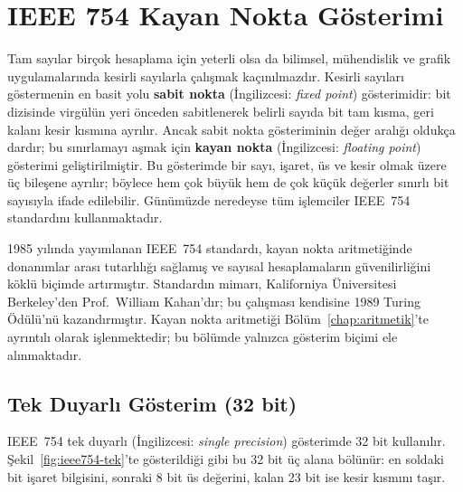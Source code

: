 \section{IEEE 754 Kayan Nokta Gösterimi}
\label{sec:ekA-ieee754}

Tam sayılar birçok hesaplama için yeterli olsa da bilimsel, mühendislik ve grafik uygulamalarında kesirli sayılarla çalışmak kaçınılmazdır. Kesirli sayıları göstermenin en basit yolu \textbf{sabit nokta} (İngilizcesi: \textit{fixed point}) gösterimidir: bit dizisinde virgülün yeri önceden sabitlenerek belirli sayıda bit tam kısma, geri kalanı kesir kısmına ayrılır. Ancak sabit nokta gösteriminin değer aralığı oldukça dardır; bu sınırlamayı aşmak için \textbf{kayan nokta} (İngilizcesi: \textit{floating point}) gösterimi geliştirilmiştir. Bu gösterimde bir sayı, işaret, üs ve kesir olmak üzere üç bileşene ayrılır; böylece hem çok büyük hem de çok küçük değerler sınırlı bit sayısıyla ifade edilebilir. Günümüzde neredeyse tüm işlemciler IEEE~754 standardını kullanmaktadır.

\begin{bilginot}
1985 yılında yayımlanan IEEE~754 standardı, kayan nokta aritmetiğinde donanımlar arası tutarlılığı sağlamış ve sayısal hesaplamaların güvenilirliğini köklü biçimde artırmıştır. Standardın mimarı, Kaliforniya Üniversitesi Berkeley'den Prof.~William Kahan'dır; bu çalışması kendisine 1989 Turing Ödülü'nü kazandırmıştır. Kayan nokta aritmetiği Bölüm~\ref{chap:aritmetik}'te ayrıntılı olarak işlenmektedir; bu bölümde yalnızca gösterim biçimi ele alınmaktadır.
\end{bilginot}

\subsection{Tek Duyarlı Gösterim (32 bit)}
\label{sec:ekA-ieee754-tek}

IEEE~754 tek duyarlı (İngilizcesi: \textit{single precision}) gösterimde 32 bit kullanılır. Şekil~\ref{fig:ieee754-tek}'te gösterildiği gibi bu 32 bit üç alana bölünür: en soldaki bit işaret bilgisini, sonraki 8 bit üs değerini, kalan 23 bit ise kesir kısmını taşır.

